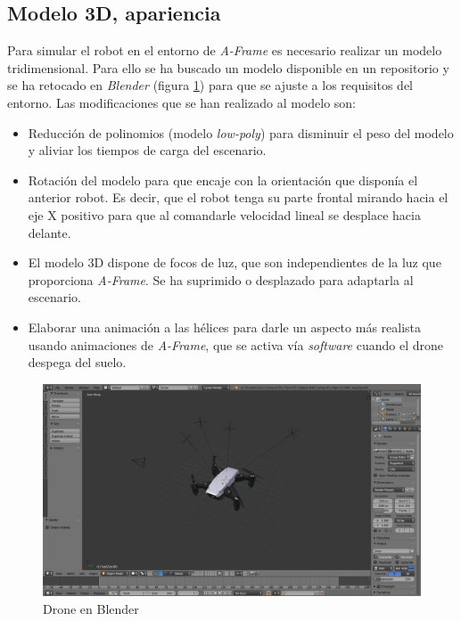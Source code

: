 \subsection{Modelo 3D, apariencia}

Para simular el robot en el entorno de \textit{A-Frame} es necesario realizar un modelo tridimensional. Para ello se ha buscado un modelo disponible en un repositorio\cite{bib:sketchfab} y se ha retocado en \textit{Blender} (figura \ref{fig:droneBlender}) para que se ajuste a los requisitos del entorno. Las modificaciones que se han realizado al modelo son: 
\begin{itemize}
    \item Reducción de polinomios (modelo \textit{low-poly}) para disminuir el peso del modelo y aliviar los tiempos de carga del escenario.
    \item Rotación del modelo para que encaje con la orientación que disponía el anterior robot. Es decir, que el robot tenga su parte frontal mirando hacia el eje X positivo para que al comandarle velocidad lineal se desplace hacia delante.
    \item El modelo 3D dispone de focos de luz, que son independientes de la luz que proporciona \textit{A-Frame}. Se ha suprimido o desplazado para adaptarla al escenario.
    
    \item Elaborar una animación a las hélices para darle un aspecto más realista usando animaciones de \textit{A-Frame}, que se activa vía \textit{software} cuando el drone despega del suelo.
    
\end{itemize}

 \begin{figure}[H]
    \centering
    \includegraphics[scale=0.3]{img/droneBlender.jpg}
    \caption{Drone en Blender} \label{fig:droneBlender}
\end{figure}


